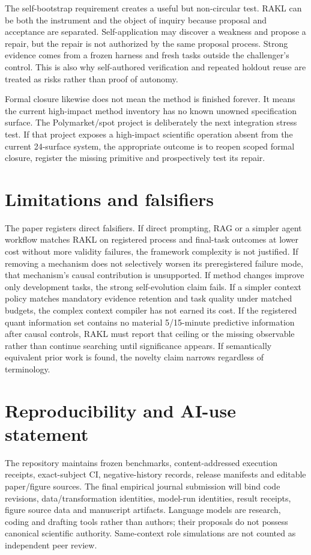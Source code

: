 \documentclass[11pt]{article}
\newcommand{\RAKL}{\textsc{RAKL}}
\begin{document}
The self-bootstrap requirement creates a useful but non-circular test. \RAKL{} can be both the instrument and the object of inquiry because proposal and acceptance are separated. Self-application may discover a weakness and propose a repair, but the repair is not authorized by the same proposal process. Strong evidence comes from a frozen harness and fresh tasks outside the challenger's control. This is also why self-authored verification and repeated holdout reuse are treated as risks rather than proof of autonomy.

Formal closure likewise does not mean the method is finished forever. It means the current high-impact method inventory has no known unowned specification surface. The Polymarket/spot project is deliberately the next integration stress test. If that project exposes a high-impact scientific operation absent from the current 24-surface system, the appropriate outcome is to reopen scoped formal closure, register the missing primitive and prospectively test its repair.

\section{Limitations and falsifiers}
The paper registers direct falsifiers. If direct prompting, RAG or a simpler agent workflow matches \RAKL{} on registered process and final-task outcomes at lower cost without more validity failures, the framework complexity is not justified. If removing a mechanism does not selectively worsen its preregistered failure mode, that mechanism's causal contribution is unsupported. If method changes improve only development tasks, the strong self-evolution claim fails. If a simpler context policy matches mandatory evidence retention and task quality under matched budgets, the complex context compiler has not earned its cost. If the registered quant information set contains no material 5/15-minute predictive information after causal controls, \RAKL{} must report that ceiling or the missing observable rather than continue searching until significance appears. If semantically equivalent prior work is found, the novelty claim narrows regardless of terminology.

\section*{Reproducibility and AI-use statement}
The repository maintains frozen benchmarks, content-addressed execution receipts, exact-subject CI, negative-history records, release manifests and editable paper/figure sources. The final empirical journal submission will bind code revisions, data/transformation identities, model-run identities, result receipts, figure source data and manuscript artifacts. Language models are research, coding and drafting tools rather than authors; their proposals do not possess canonical scientific authority. Same-context role simulations are not counted as independent peer review.
\end{document}
